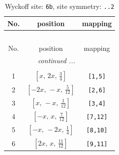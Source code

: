 \documentclass[fleqn,8pt]{jsarticle}
\begin{document}
\begin{longtable}{ccc}
\caption{Wyckoff site: {\tt 6b}, site symmetry: {\tt ..2}}
 \\
 \hline \hline
No. & position & mapping \\ \hline \endfirsthead

\multicolumn{2}{l}{\tablename\ \thetable{}} \\
 \hline \hline
No. & position & mapping \\ \hline \endhead

 \hline \hline
\multicolumn{2}{r}{\footnotesize\it continued ...} \\ \endfoot

 \hline \hline
\multicolumn{2}{r}{} \\ \endlastfoot

1 & $\left[ x,\, 2 x,\, \frac{3}{4} \right]$ & {\tt [1,5]} \\ \hline
2 & $\left[ - 2 x,\, - x,\, \frac{5}{12} \right]$ & {\tt [2,6]} \\ \hline
3 & $\left[ x,\, - x,\, \frac{1}{12} \right]$ & {\tt [3,4]} \\ \hline
4 & $\left[ - x,\, x,\, \frac{7}{12} \right]$ & {\tt [7,12]} \\ \hline
5 & $\left[ - x,\, - 2 x,\, \frac{1}{4} \right]$ & {\tt [8,10]} \\ \hline
6 & $\left[ 2 x,\, x,\, \frac{11}{12} \right]$ & {\tt [9,11]} \\
\end{longtable}
\renewcommand{\arraystretch}{1.2}
\end{document}
